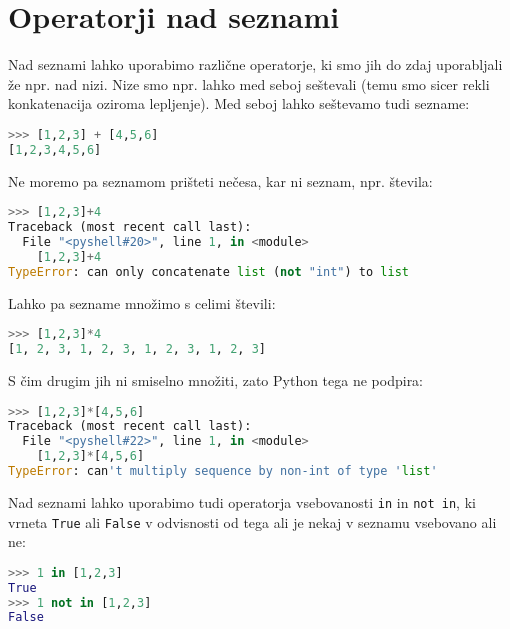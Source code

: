 \section{Operatorji nad seznami}

Nad seznami lahko uporabimo različne operatorje, ki smo jih do zdaj uporabljali že npr. nad nizi. Nize smo npr. lahko med seboj seštevali (temu smo sicer rekli konkatenacija oziroma lepljenje). Med seboj lahko seštevamo tudi sezname:
\begin{lstlisting}[language=Python, showstringspaces=false]
>>> [1,2,3] + [4,5,6]
[1,2,3,4,5,6]
\end{lstlisting}
Ne moremo pa seznamom prišteti nečesa, kar ni seznam, npr. števila:
\begin{lstlisting}[language=Python, showstringspaces=false]
>>> [1,2,3]+4
Traceback (most recent call last):
  File "<pyshell#20>", line 1, in <module>
    [1,2,3]+4
TypeError: can only concatenate list (not "int") to list
\end{lstlisting}
Lahko pa sezname množimo s celimi števili:
\begin{lstlisting}[language=Python, showstringspaces=false]
>>> [1,2,3]*4
[1, 2, 3, 1, 2, 3, 1, 2, 3, 1, 2, 3]
\end{lstlisting}
S čim drugim jih ni smiselno množiti, zato Python tega ne podpira:
\begin{lstlisting}[language=Python, showstringspaces=false]
>>> [1,2,3]*[4,5,6]
Traceback (most recent call last):
  File "<pyshell#22>", line 1, in <module>
    [1,2,3]*[4,5,6]
TypeError: can't multiply sequence by non-int of type 'list'
\end{lstlisting}

Nad seznami lahko uporabimo tudi operatorja vsebovanosti \texttt{in} in \texttt{not in}, ki vrneta \texttt{True} ali \texttt{False} v odvisnosti od tega ali je nekaj v seznamu vsebovano ali ne:
\begin{lstlisting}[language=Python, showstringspaces=false]
>>> 1 in [1,2,3]
True
>>> 1 not in [1,2,3]
False
\end{lstlisting}

